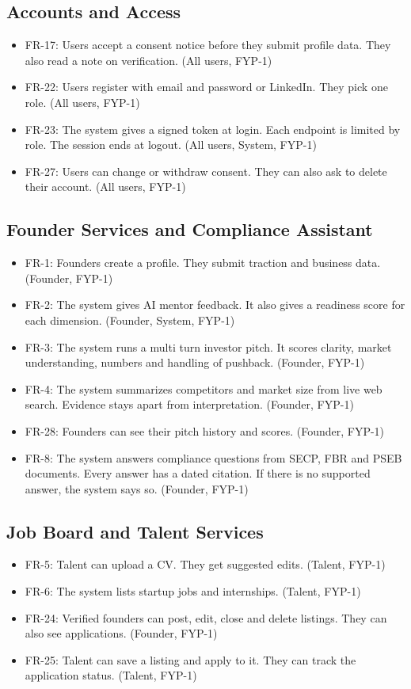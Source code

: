 \documentclass{FastFyp}
\begin{document}
\subsection{Accounts and Access}
\begin{itemize}
\item FR-17: Users accept a consent notice before they submit profile data. They also read a note on verification. (All users, FYP-1)
\item FR-22: Users register with email and password or LinkedIn. They pick one role. (All users, FYP-1)
\item FR-23: The system gives a signed token at login. Each endpoint is limited by role. The session ends at logout. (All users, System, FYP-1)
\item FR-27: Users can change or withdraw consent. They can also ask to delete their account. (All users, FYP-1)
\end{itemize}

\subsection{Founder Services and Compliance Assistant}
\begin{itemize}
\item FR-1: Founders create a profile. They submit traction and business data. (Founder, FYP-1)
\item FR-2: The system gives AI mentor feedback. It also gives a readiness score for each dimension. (Founder, System, FYP-1)
\item FR-3: The system runs a multi turn investor pitch. It scores clarity, market understanding, numbers and handling of pushback. (Founder, FYP-1)
\item FR-4: The system summarizes competitors and market size from live web search. Evidence stays apart from interpretation. (Founder, FYP-1)
\item FR-28: Founders can see their pitch history and scores. (Founder, FYP-1)
\item FR-8: The system answers compliance questions from SECP, FBR and PSEB documents. Every answer has a dated citation. If there is no supported answer, the system says so. (Founder, FYP-1)
\end{itemize}

\subsection{Job Board and Talent Services}
\begin{itemize}
\item FR-5: Talent can upload a CV. They get suggested edits. (Talent, FYP-1)
\item FR-6: The system lists startup jobs and internships. (Talent, FYP-1)
\item FR-24: Verified founders can post, edit, close and delete listings. They can also see applications. (Founder, FYP-1)
\item FR-25: Talent can save a listing and apply to it. They can track the application status. (Talent, FYP-1)
\end{itemize}
\end{document}
